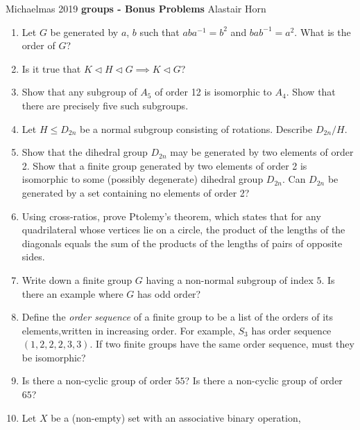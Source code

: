 \documentclass[a4paper, 12pt]{article}
\begin{document}
      \begingroup
      Michaelmas 2019
      \hspace*{\fill}
      \textbf{groups - Bonus Problems}
      \hspace*{\fill} Alastair Horn
      \endgroup

      \vspace{0.3cm}

      \begin{enumerate}
            \item Let $G$ be generated by $a$, $b$ such that $aba^{-1} = b^2$ and $bab^{-1} = a^2$.
                  What is the order of $G$?
            \item Is it true that $K \triangleleft H \triangleleft G \implies K \triangleleft G$?
            \item Show that any subgroup of $A_5$ of order 12 is isomorphic to $A_4$. Show that
                  there are precisely five such subgroups.
            \item Let $H \leq D_{2n}$ be a normal subgroup consisting of rotations. Describe $D_{2n} / H$.
            \item Show that the dihedral group $D_{2n}$ may be generated by two elements of order 2.
                  Show that a finite group generated by two elements of order 2 is isomorphic to
                  some (possibly degenerate) dihedral group $D_{2n}$. Can $D_{2n}$ be generated by a set
                  containing no elements of order 2?
            \item Using cross-ratios, prove Ptolemy’s theorem, which states that for any 
                  quadrilateral whose vertices lie on a circle, the product of the lengths of the
                  diagonals equals the sum of the products of the lengths of pairs of opposite sides.
            \item Write down a finite group $G$ having a non-normal subgroup of index $5$. Is there an
                  example where $G$ has odd order?
            \item Define the \textit{order sequence} of a finite group to be a
                  list of the orders of its elements,written in increasing order.
                  For example, $S_3$ has order sequence $(1,2,2,2,3,3)$. If two finite
                  groups have the same order sequence, must they be isomorphic?
            \item Is there a non-cyclic group of order $55$? Is there a non-cyclic
            group of order $65$?
            \item Let $X$ be a (non-empty) set with an associative binary operation,

\end{enumerate}
\end{document}
